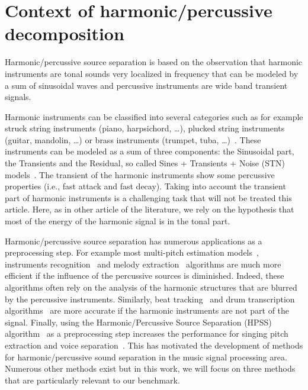 \section{Context of harmonic/percussive decomposition}
\label{sec:Background}

Harmonic/percussive source separation is based on the observation that harmonic instruments are tonal sounds very localized in frequency that can be modeled by a sum of sinusoidal waves and percussive instruments are wide band transient signals.

Harmonic instruments can be classified into several categories such as for example struck string instruments (piano, harpsichord, \ldots), plucked string instruments (guitar, mandolin, \ldots) or brass instruments (trumpet, tuba, \ldots)~\cite{peeters2003automatic}. These instruments can be modeled as a sum of three components: the Sinusoidal part, the Transients and the Residual, so called  Sines + Transients + Noise (STN) models~\cite{daudet2006review}. The transient of the harmonic instruments show some percussive properties (i.e., fast attack and fast decay). Taking into account the transient part of harmonic instruments is a challenging task that will not be treated this article. Here, as in other article of the literature, we rely on the hypothesis that most of the energy of the harmonic signal is in the tonal part. 

Harmonic/percussive source separation has numerous applications as a preprocessing step. For example most multi-pitch estimation models~\cite{klapuri2008multipitch}, instruments recognition~\cite{eronen2000musical} and melody extraction~\cite{salamon2012melody} algorithms are much more efficient if the influence of the percussive sources is diminished. Indeed, these algorithms often rely on the analysis of the harmonic structures that are blurred by the percussive instruments. Similarly, beat tracking~\cite{ellis2007beat} and drum transcription algorithms~\cite{paulus2005drum} are more accurate if the harmonic instruments are not part of the signal. Finally, using the Harmonic/Percussive Source Separation (HPSS) algorithm~\cite{fitzgerald2010harmonic} as a preprocessing step increases the performance for singing pitch extraction and voice separation~\cite{hsu2012tandem}. This has motivated the development of methods for harmonic/percussive sound separation in the music signal processing area. Numerous other methods exist but in this work, we will focus on three methods that are particularly relevant to our benchmark. 

